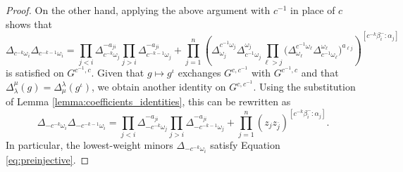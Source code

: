 \documentclass[12pt]{amsart}
\newcommand{\ol}[1]{\overline{#1}}
\theoremstyle{remark}
\numberwithin{equation}{section}
\numberwithin{figure}{section}
\begin{document}
\begin{proof}
On the other hand, applying the above argument with $c^{-1}$ in place of $c$ shows that  
\begin{equation*} \Delta_{c^{-k}\omega_i} \Delta_{c^{-k-1}\omega_i} = 
    \prod_{j<i}\Delta_{c^{-k}\omega_j}^{-a_{ji}}
    \prod_{j>i}\Delta_{c^{-k-1}\omega_j}^{-a_{ji}}
    +
    \prod_{j=1}^n\left( 
      \Delta^{c^{-1} \omega_j}_{\omega_j}
      \Delta^{\omega_j}_{ c^{-1}\omega_j} 
      \prod_{\ell>j}\big(
        \Delta^{c^{-1} \omega_\ell}_{\omega_\ell} 
        \Delta^{\omega_\ell}_{c^{-1} \omega_\ell}
      \big)^{a_{\ell j}}
    \right)^{[c^{-k}\beta_i^-:\alpha_j]}
\end{equation*}
is satisfied on $G^{c^{-1},c}$. Given that $g \mapsto g^\iota$ exchanges $G^{c,c^{-1}}$ with $G^{c^{-1},c}$ and that $\Delta_\lambda^\mu(g) = \Delta_\mu^\lambda(g^\iota)$, we obtain another identity on $G^{c,c^{-1}}$. Using the substitution of Lemma \ref{lemma:coefficients_identities}, this can be rewritten as
\begin{equation}
\Delta_{-c^{-k}\omega_i}\Delta_{-c^{-k-1}\omega_i} =
    \prod_{j<i}\Delta_{-c^{-k}\omega_j}^{-a_{ji}}
    \prod_{j>i}\Delta_{-c^{-k-1}\omega_j}^{-a_{ji}}
    +
    \prod_{j=1}^n (z_j z_{\ol{j}})^{[c^{-k}\beta_i^-:\alpha_j]}.
\end{equation}
In particular, the lowest-weight minors $\Delta_{-c^{-k}\omega_i}$ satisfy Equation \ref{eq:preinjective}.


\end{proof}
\end{document}
